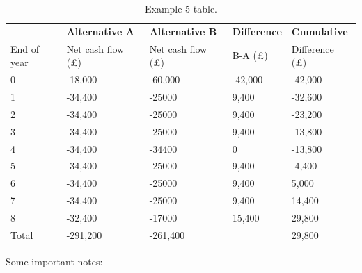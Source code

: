 \begin{table}[H]
    \centering
    \begin{tabular}{@{}lllll@{}}
        \toprule
                    & \textbf{Alternative A}  & \textbf{Alternative B}  & \textbf{Difference} & \textbf{Cumulative}  \\
        End of year & Net cash flow (\pounds) & Net cash flow (\pounds) & B-A (\pounds)       & Difference (\pounds) \\
        \midrule
        0           & -18,000                 & -60,000                 & -42,000             & -42,000              \\
        1           & -34,400                 & -25000                  & 9,400               & -32,600              \\
        2           & -34,400                 & -25000                  & 9,400               & -23,200              \\
        3           & -34,400                 & -25000                  & 9,400               & -13,800              \\
        4           & -34,400                 & -34400                  & 0                   & -13,800              \\
        5           & -34,400                 & -25000                  & 9,400               & -4,400               \\
        6           & -34,400                 & -25000                  & 9,400               & 5,000                \\
        7           & -34,400                 & -25000                  & 9,400               & 14,400               \\
        8           & -32,400                 & -17000                  & 15,400              & 29,800               \\
        \midrule
        Total       & -291,200                & -261,400                &                     & 29,800               \\
        \bottomrule
    \end{tabular}
    \caption{Example 5 table.}
\end{table}
Some important notes:
